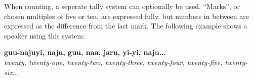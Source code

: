 When counting, a seperate tally system can optionally be used. ``Marks'', or
chosen multiples of five or ten, are expressed fully, but numbers in between are
expressed as the difference from the last mark. The following example shows a
speaker using this system:

\begin{sentence}
\textbf{guu-najuyi, naju, guu, naa, jaru, yi-yi, naju...}\\
\textit{twenty, twenty-one, twenty-two, twenty-three, twenty-four, twenty-five, twenty-six...}
\end{sentence}
